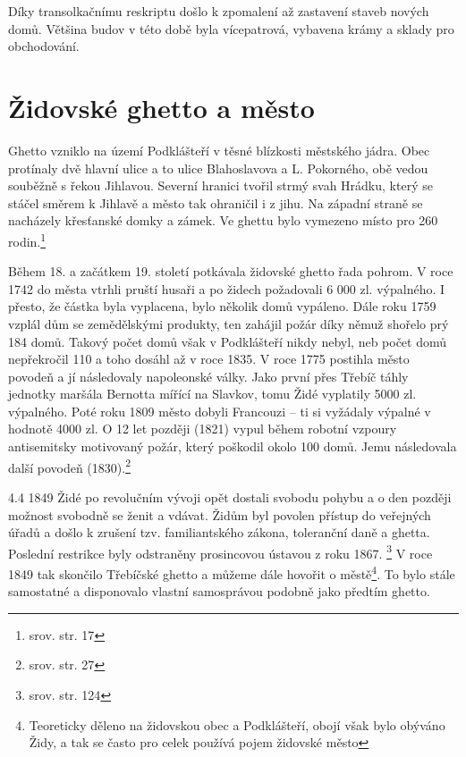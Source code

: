 \documentclass[a4paper,oneside,12pt]{report}
\begin{document}
Díky transolkačnímu reskriptu došlo k zpomalení až zastavení staveb nových domů.
Většina budov v této době byla vícepatrová, vybavena krámy a sklady pro obchodování.

\section{Židovské ghetto a město}

Ghetto vzniklo na území Podklášteří v těsné blízkosti městského jádra.
Obec protínaly dvě hlavní ulice a to ulice Blahoslavova a L. Pokorného, obě vedou souběžně s řekou Jihlavou.
Severní hranici tvořil strmý svah Hrádku, který se stáčel směrem k Jihlavě a město tak ohraničil i z jihu.
Na západní straně se nacházely křesťanské domky a zámek.
Ve ghettu bylo vymezeno místo pro 260 rodin.\footnote{srov. \cite{Kracmova2011} str. 17}

Během 18. a začátkem 19. století potkávala židovské ghetto řada pohrom.
V roce 1742 do města vtrhli pruští husaři a po židech požadovali 6 000 zl. výpalného.
I přesto, že částka byla vyplacena, bylo několik domů vypáleno.
Dále roku 1759 vzplál dům se zemědělskými produkty, ten zahájil požár díky němuž shořelo prý 184 domů.
Takový počet domů však v Podklášteří nikdy nebyl, neb počet domů nepřekročil 110 a toho dosáhl až v roce 1835.
V roce 1775 postihla město povodeň a jí následovaly napoleonské války.
Jako první přes Třebíč táhly jednotky maršála Bernotta mířící na Slavkov, tomu Židé vyplatily 5000 zl. výpalného.
Poté roku 1809 město dobyli Francouzi -- ti si vyžádaly výpalné v hodnotě 4000 zl.
O 12 let později (1821) vypul během robotní vzpoury antisemitsky motivovaný požár, který poškodil okolo 100 domů.
Jemu následovala další povodeň (1830).\footnote{srov. \cite{Fiser2005} str. 27}


4.4 1849 Židé po revolučním vývoji opět dostali svobodu pohybu a o den později možnost svobodně se ženit a vdávat.
Židům byl povolen přístup do veřejných úřadů a došlo k zrušení tzv. familiantského zákona, toleranční daně a ghetta.
Poslední restrikce byly odstraněny prosincovou ústavou z roku 1867. \footnote{srov. \cite{Pekny2001} str. 124}
V roce 1849 tak skončilo Třebíčské ghetto a můžeme dále hovořit o městě\footnote{Teoreticky děleno na židovskou obec a Podklášteří, obojí však bylo obýváno Židy, a tak se často pro celek používá pojem židovské město}.
To bylo stále samostatné a disponovalo vlastní samosprávou podobně jako předtím ghetto.
\end{document}
